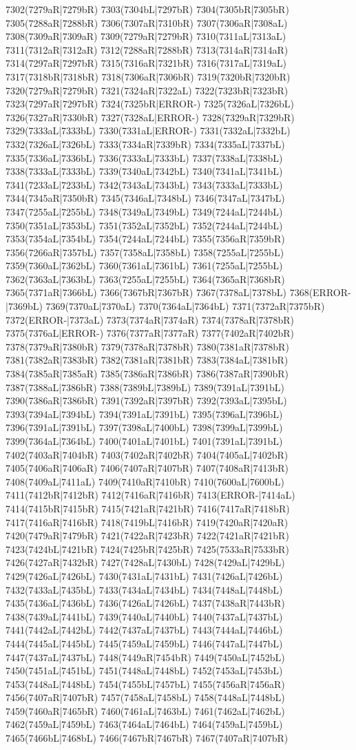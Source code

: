 7302(7279aR|7279bR) 7303(7304bL|7297bR) 7304(7305bR|7305bR) 7305(7288aR|7288bR) 7306(7307aR|7310bR) 7307(7306aR|7308aL) 7308(7309aR|7309aR) 7309(7279aR|7279bR) 7310(7311aL|7313aL) 7311(7312aR|7312aR) 7312(7288aR|7288bR) 7313(7314aR|7314aR) 7314(7297aR|7297bR) 7315(7316aR|7321bR) 7316(7317aL|7319aL) 7317(7318bR|7318bR) 7318(7306aR|7306bR) 7319(7320bR|7320bR) 7320(7279aR|7279bR) 7321(7324aR|7322aL) 7322(7323bR|7323bR) 7323(7297aR|7297bR) 7324(7325bR|ERROR-) 7325(7326aL|7326bL) 7326(7327aR|7330bR) 7327(7328aL|ERROR-) 7328(7329aR|7329bR) 7329(7333aL|7333bL) 7330(7331aL|ERROR-) 7331(7332aL|7332bL) 7332(7326aL|7326bL) 7333(7334aR|7339bR) 7334(7335aL|7337bL) 7335(7336aL|7336bL) 7336(7333aL|7333bL) 7337(7338aL|7338bL) 7338(7333aL|7333bL) 7339(7340aL|7342bL) 7340(7341aL|7341bL) 7341(7233aL|7233bL) 7342(7343aL|7343bL) 7343(7333aL|7333bL) 7344(7345aR|7350bR) 7345(7346aL|7348bL) 7346(7347aL|7347bL) 7347(7255aL|7255bL) 7348(7349aL|7349bL) 7349(7244aL|7244bL) 7350(7351aL|7353bL) 7351(7352aL|7352bL) 7352(7244aL|7244bL) 7353(7354aL|7354bL) 7354(7244aL|7244bL) 7355(7356aR|7359bR) 7356(7266aR|7357bL) 7357(7358aL|7358bL) 7358(7255aL|7255bL) 7359(7360aL|7362bL) 7360(7361aL|7361bL) 7361(7255aL|7255bL) 7362(7363aL|7363bL) 7363(7255aL|7255bL) 7364(7365aR|7368bR) 7365(7371aR|7366bL) 7366(7367bR|7367bR) 7367(7378aL|7378bL) 7368(ERROR-|7369bL) 7369(7370aL|7370aL) 7370(7364aL|7364bL) 7371(7372aR|7375bR) 7372(ERROR-|7373aL) 7373(7374aR|7374aR) 7374(7378aR|7378bR) 7375(7376aL|ERROR-) 7376(7377aR|7377aR) 7377(7402aR|7402bR) 7378(7379aR|7380bR) 7379(7378aR|7378bR) 7380(7381aR|7378bR) 7381(7382aR|7383bR) 7382(7381aR|7381bR) 7383(7384aL|7381bR) 7384(7385aR|7385aR) 7385(7386aR|7386bR) 7386(7387aR|7390bR) 7387(7388aL|7386bR) 7388(7389bL|7389bL) 7389(7391aL|7391bL) 7390(7386aR|7386bR) 7391(7392aR|7397bR) 7392(7393aL|7395bL) 7393(7394aL|7394bL) 7394(7391aL|7391bL) 7395(7396aL|7396bL) 7396(7391aL|7391bL) 7397(7398aL|7400bL) 7398(7399aL|7399bL) 7399(7364aL|7364bL) 7400(7401aL|7401bL) 7401(7391aL|7391bL) 7402(7403aR|7404bR) 7403(7402aR|7402bR) 7404(7405aL|7402bR) 7405(7406aR|7406aR) 7406(7407aR|7407bR) 7407(7408aR|7413bR) 7408(7409aL|7411aL) 7409(7410aR|7410bR) 7410(7600aL|7600bL) 7411(7412bR|7412bR) 7412(7416aR|7416bR) 7413(ERROR-|7414aL) 7414(7415bR|7415bR) 7415(7421aR|7421bR) 7416(7417aR|7418bR) 7417(7416aR|7416bR) 7418(7419bL|7416bR) 7419(7420aR|7420aR) 7420(7479aR|7479bR) 7421(7422aR|7423bR) 7422(7421aR|7421bR) 7423(7424bL|7421bR) 7424(7425bR|7425bR) 7425(7533aR|7533bR) 7426(7427aR|7432bR) 7427(7428aL|7430bL) 7428(7429aL|7429bL) 7429(7426aL|7426bL) 7430(7431aL|7431bL) 7431(7426aL|7426bL) 7432(7433aL|7435bL) 7433(7434aL|7434bL) 7434(7448aL|7448bL) 7435(7436aL|7436bL) 7436(7426aL|7426bL) 7437(7438aR|7443bR) 7438(7439aL|7441bL) 7439(7440aL|7440bL) 7440(7437aL|7437bL) 7441(7442aL|7442bL) 7442(7437aL|7437bL) 7443(7444aL|7446bL) 7444(7445aL|7445bL) 7445(7459aL|7459bL) 7446(7447aL|7447bL) 7447(7437aL|7437bL) 7448(7449aR|7454bR) 7449(7450aL|7452bL) 7450(7451aL|7451bL) 7451(7448aL|7448bL) 7452(7453aL|7453bL) 7453(7448aL|7448bL) 7454(7455bL|7457bL) 7455(7456aR|7456aR) 7456(7407aR|7407bR) 7457(7458aL|7458bL) 7458(7448aL|7448bL) 7459(7460aR|7465bR) 7460(7461aL|7463bL) 7461(7462aL|7462bL) 7462(7459aL|7459bL) 7463(7464aL|7464bL) 7464(7459aL|7459bL) 7465(7466bL|7468bL) 7466(7467bR|7467bR) 7467(7407aR|7407bR) 